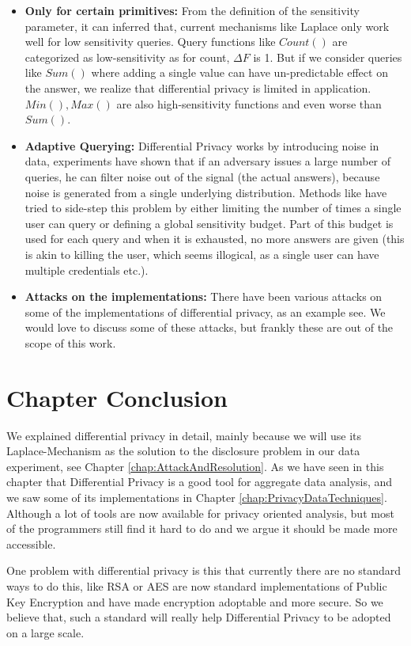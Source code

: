 \documentclass[12pt]{report}
\theoremstyle{named}
\begin{document}
\begin{itemize}
  \item \textbf{Only for certain primitives:} From the definition of the sensitivity parameter, it can inferred that, current mechanisms like Laplace only work well for low sensitivity queries. Query functions like $Count()$ are categorized as low-sensitivity as for count, $\Delta F$ is 1. But if we consider queries like $Sum()$ where adding a single value can have un-predictable effect on the answer, we realize that differential privacy is limited in application. $Min(),Max()$ are also high-sensitivity functions and even worse than $Sum()$.
  \item \textbf{Adaptive Querying:} Differential Privacy works by introducing noise in data, experiments have shown that if an adversary issues a large number of queries, he can filter noise out of the signal (the actual answers), because noise is generated from a single underlying distribution. Methods like \cite{dwork2004privacy} have tried to side-step this problem by either limiting the number of times a single user can query or defining a global sensitivity budget. Part of this budget is used for each query and when it is exhausted, no more answers are given (this is akin to killing the user, which seems illogical, as a single user can have multiple credentials etc.).
  \item \textbf{Attacks on the implementations:} There have been various attacks on some of the implementations of differential privacy, as an example see\cite{haeberlen2011differential}. We would love to discuss some of these attacks, but frankly these are out of the scope of this work.
\end{itemize}
\section{Chapter Conclusion}
We explained differential privacy in detail, mainly because we will use its Laplace-Mechanism as the solution to the disclosure problem in our data experiment, see Chapter \ref{chap:AttackAndResolution}. As we have seen in this chapter that Differential Privacy is a good tool for aggregate data analysis, and we saw some of its implementations in Chapter \ref{chap:PrivacyDataTechniques}. Although a lot of tools are now available for privacy oriented analysis, but most of the programmers still find it hard to do and we argue it should be made more accessible. 

One problem with differential privacy is this that currently there are no standard ways to do this, like RSA or AES are now standard implementations of Public Key Encryption and have made encryption adoptable and more secure. So we believe that, such a standard will really help Differential Privacy to be adopted on a large scale.
\end{document}
